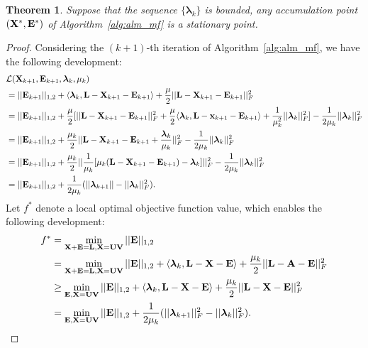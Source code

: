 \documentclass[letterpaper]{article}
\newtheorem{theorem}{Theorem}
\def\bE{{\bf E}}
\def\blambda{{\bm \lambda}}
\def\calL{{\mathcal{L}}}
\def\bL{{\bf L}}
\def\bU{{\bf U}}
\def\bV{{\bf V}}
\def\bX{{\bf X}}
\def\bx{{\bf x}}
\def\bA{{\bf A}}
\def\bx{{\bf x}}
\def\bX{{\bf X}}
\begin{document}
\begin{theorem}\label{theorem:alm_convergence}
  Suppose that the sequence $\{ \blambda_{k} \}$ is bounded, any accumulation point $(\bX^*, \bE^*)$ of Algorithm~\ref{alg:alm_mf} is a stationary point.
\end{theorem}

\begin{proof}
    Considering the $(k+1)$-th iteration of Algorithm~\ref{alg:alm_mf}, we have the following development:
    \begin{align}\label{eq:proof1}
      & \calL(\bX_{k+1}, \bE_{k+1}, \blambda_{k}, \mu_{k})   \nonumber \\
      & = || \bE_{k+1} ||_{1,2} + \langle \blambda_{k}, \bL - \bX_{k+1} - \bE_{k+1} \rangle + \frac{\mu}{2} || \bL - \bX_{k+1} - \bE_{k+1} ||_{F}^2         \nonumber \\
      & = || \bE_{k+1} ||_{1,2} + \frac{\mu}{2} [ || \bL - \bX_{k+1} - \bE_{k+1} ||_{F}^2 + \frac{\mu}{2} \langle \blambda_{k}, \bL - \bx_{k+1} - \bE_{k+1} \rangle + \frac{1}{\mu_{k}^2} || \blambda_k ||_F^2 ] - \frac{1}{2\mu_k} || \blambda_k ||_F^2    \nonumber  \\
      & = || \bE_{k+1} ||_{1,2} + \frac{\mu_k}{2} || \bL - \bX_{k+1} - \bE_{k+1} + \frac{\blambda_k}{\mu_k} ||_F^2 - \frac{1}{2\mu_k} || \blambda_k ||_F^2   \nonumber \\
      & = || \bE_{k+1} ||_{1,2} + \frac{\mu_k}{2} || \frac{1}{\mu_k} [ \mu_k (\bL - \bX_{k+1} - \bE_{k+1}) - \blambda_k ] ||_F^2 - \frac{1}{2\mu_k} || \blambda_k ||_F^2   \nonumber \\
      & = || \bE_{k+1} ||_{1,2} + \frac{1}{2\mu_k} ( || \blambda_{k+1} || - || \blambda_{k} ||_F^2 )   .
    \end{align}
    \noindent
    Let $f^*$ denote a local optimal objective function value, which enables the following development:
    \begin{align}\label{eq:proof2}
      f^* & = \min_{\bX + \bE = \bL, \bX = \bU \bV} || \bE ||_{1,2}   \nonumber  \\
          & = \min_{\bX + \bE = \bL, \bX = \bU \bV} || \bE ||_{1,2} + \langle \blambda_k, \bL - \bX - \bE \rangle + \frac{\mu_k}{2} || \bL - \bA - \bE ||_F^2   \nonumber \\
          & \geq \min_{\bE, \bX = \bU \bV} || \bE ||_{1,2} + \langle \blambda_k, \bL - \bX - \bE \rangle + \frac{\mu_k}{2} ||  \bL -
          \bX - \bE ||_F^2     \nonumber \\
          & = \min_{\bE, \bX = \bU \bV} || \bE ||_{1,2} + \frac{1}{2\mu_k} (|| \blambda_{k+1} ||_F^2 - || \blambda_{k} ||_F^2)   .

\end{align}
\end{proof}
\end{document}
